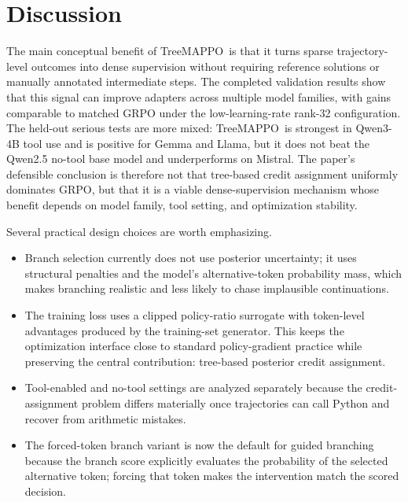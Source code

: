 \documentclass{article}
\newcommand{\ours}{TreeMAPPO}
\begin{document}
\section{Discussion}
The main conceptual benefit of \ours\ is that it turns sparse trajectory-level outcomes into dense supervision without requiring reference solutions or manually annotated intermediate steps. The completed validation results show that this signal can improve adapters across multiple model families, with gains comparable to matched GRPO under the low-learning-rate rank-32 configuration. The held-out serious tests are more mixed: \ours\ is strongest in Qwen3-4B tool use and is positive for Gemma and Llama, but it does not beat the Qwen2.5 no-tool base model and underperforms on Mistral. The paper's defensible conclusion is therefore not that tree-based credit assignment uniformly dominates GRPO, but that it is a viable dense-supervision mechanism whose benefit depends on model family, tool setting, and optimization stability.

Several practical design choices are worth emphasizing.
\begin{itemize}
    \item Branch selection currently does not use posterior uncertainty; it uses structural penalties and the model's alternative-token probability mass, which makes branching realistic and less likely to chase implausible continuations.
    \item The training loss uses a clipped policy-ratio surrogate with token-level advantages produced by the training-set generator. This keeps the optimization interface close to standard policy-gradient practice while preserving the central contribution: tree-based posterior credit assignment.
    \item Tool-enabled and no-tool settings are analyzed separately because the credit-assignment problem differs materially once trajectories can call Python and recover from arithmetic mistakes.
    \item The forced-token branch variant is now the default for guided branching because the branch score explicitly evaluates the probability of the selected alternative token; forcing that token makes the intervention match the scored decision.
\end{itemize}
\end{document}
